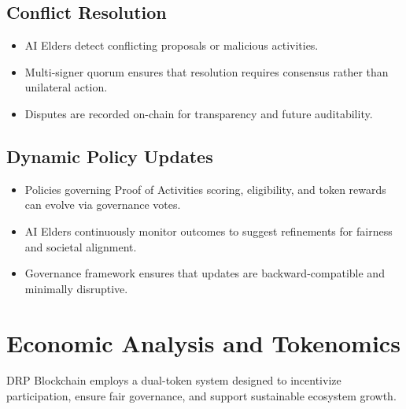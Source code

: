 \documentclass[11pt,a4paper]{article}
\begin{document}
\subsection{Conflict Resolution}
\begin{itemize}
    \item AI Elders detect conflicting proposals or malicious activities.  
    \item Multi-signer quorum ensures that resolution requires consensus rather than unilateral action.  
    \item Disputes are recorded on-chain for transparency and future auditability.  
\end{itemize}

\subsection{Dynamic Policy Updates}
\begin{itemize}
    \item Policies governing Proof of Activities scoring, eligibility, and token rewards can evolve via governance votes.  
    \item AI Elders continuously monitor outcomes to suggest refinements for fairness and societal alignment.  
    \item Governance framework ensures that updates are backward-compatible and minimally disruptive.  
\end{itemize}

\section{Economic Analysis and Tokenomics}

DRP Blockchain employs a dual-token system designed to incentivize participation, ensure fair governance, and support sustainable ecosystem growth.
\end{document}
